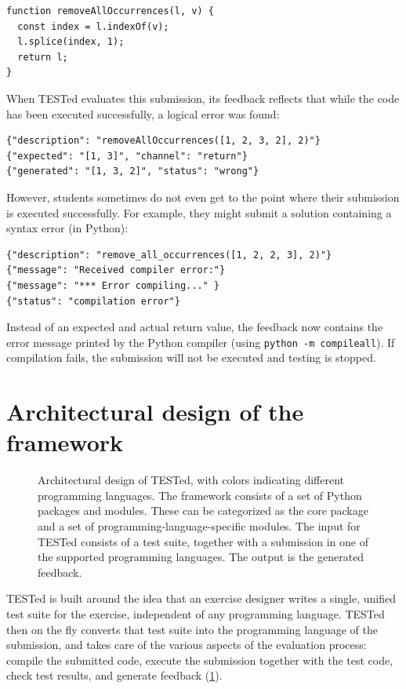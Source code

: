 \documentclass[../main]{subfiles}
\begin{document}
\begin{verbatim}
function removeAllOccurrences(l, v) {
  const index = l.indexOf(v);
  l.splice(index, 1);
  return l;
}
\end{verbatim}

When TESTed evaluates this submission, its feedback reflects that while the code has been executed successfully, a logical error was found:

\begin{verbatim}
{"description": "removeAllOccurrences([1, 2, 3, 2], 2)"}
{"expected": "[1, 3]", "channel": "return"}
{"generated": "[1, 3, 2]", "status": "wrong"}
\end{verbatim}

However, students sometimes do not even get to the point where their submission is executed successfully.
For example, they might submit a solution containing a syntax error (in Python):

\begin{verbatim}
{"description": "remove_all_occurrences([1, 2, 2, 3], 2)"}
{"message": "Received compiler error:"}
{"message": "*** Error compiling..." }
{"status": "compilation error"}
\end{verbatim}

Instead of an expected and actual return value, the feedback now contains the error message printed by the Python compiler (using \texttt{python -m compileall}).
If compilation fails, the submission will not be executed and testing is stopped.

\section{Architectural design of the framework}\label{sec:tested1-architectural-design}

\begin{figure}[t]
    \centering
    
    \caption{
        Architectural design of TESTed, with colors indicating different programming languages.
        The framework consists of a set of Python packages and modules.
        These can be categorized as the core package and a set of programming-language-specific modules.
        The input for TESTed consists of a test suite, together with a submission in one of the supported programming languages.
        The output is the generated feedback.
    }
    \label{fig:conceptual-design}
\end{figure}

TESTed is built around the idea that an exercise designer writes a single, unified test suite for the exercise, independent of any programming language.
TESTed then on the fly converts that test suite into the programming language of the submission, and takes care of the various aspects of the evaluation process: compile the submitted code, execute the submission together with the test code, check test results, and generate feedback (\cref{fig:conceptual-design}).
\end{document}
